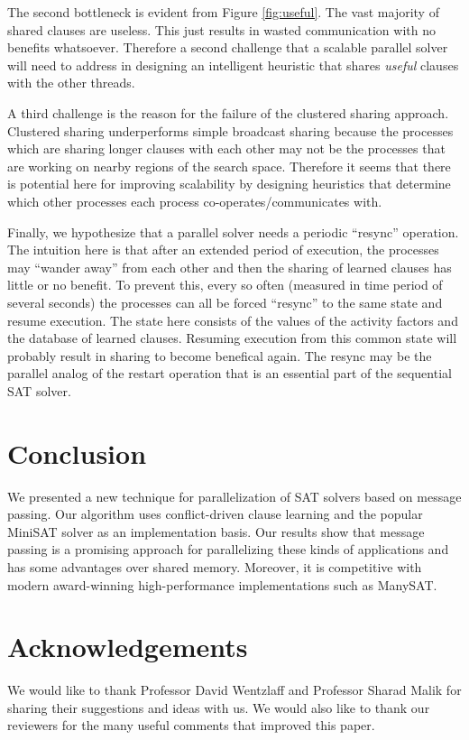 \documentclass[letterpaper, compsoc, conference]{IEEEtran}
\begin{document}
The second bottleneck is evident from Figure \ref{fig:useful}. The vast
majority of shared clauses are useless. This just results in wasted communication
with no benefits whatsoever. Therefore a second challenge that a scalable
parallel solver will need to address in designing an intelligent heuristic
that shares \emph{useful} clauses with the other threads.

A third challenge is the reason for the failure of the clustered sharing
approach. Clustered sharing underperforms simple broadcast sharing because the
processes which are sharing longer clauses with each other may not be the
processes that are working on nearby regions of the search space. Therefore
it seems that there is potential here for improving scalability by
designing heuristics that determine which other processes each process
co-operates/communicates with.

Finally, we hypothesize that a parallel solver needs a periodic ``resync''
operation. The intuition here is that after an extended period of execution,
the processes may ``wander away'' from each other and then the sharing of
learned clauses has little or no benefit. To prevent this, every so often
(measured in time period of several seconds) the processes can all be forced
``resync'' to the same state and resume execution. The state here consists of
the values of the activity factors and the database of learned clauses.
Resuming execution from this common state will probably result in sharing
to become benefical again. The resync may be the parallel analog of the restart
operation that is an essential part of the sequential SAT solver.

\section{Conclusion}
\label{sec:finish}

We presented a new technique for parallelization of SAT solvers based
on message passing. Our algorithm uses conflict-driven clause learning 
and the popular MiniSAT solver as an implementation basis. Our results show that 
message passing is a promising approach for parallelizing these kinds of 
applications and has some advantages over shared memory. Moreover, it is
competitive with modern award-winning high-performance implementations such as ManySAT.

\section*{Acknowledgements}
We would like to thank Professor David Wentzlaff and Professor Sharad Malik for
sharing their suggestions and ideas with us. We would also like to thank our
reviewers for the many useful comments that improved this paper.

\footnotesize{


}
\end{document}
